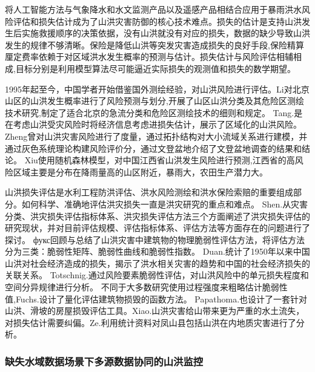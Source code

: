 \documentclass{ctexart}
\begin{document}
将人工智能方法与气象降水和水文监测产品以及遥感产品相结合应用于暴雨洪水风险评估和损失估计成为了山洪灾害防御的核心技术难点。损失的估计是支持山洪发生后实施救援顺序的决策依据，没有山洪就没有对应的损失，数据的缺少导致山洪发生的规律不够清晰。保险是降低山洪等突发灾害造成损失的良好手段,保险精算厘定费率依赖于对区域洪水发生概率的预测与估计。损失估计与风险评估相辅相成,目标分别是利用模型算法尽可能逼近实际损失的观测值和损失的数学期望。

1995年起至今，中国学者开始借鉴国外测绘经验，对山洪风险进行评估。Li\cite{lixian1995torrent}对北京山区的山洪发生概率进行了风险预测与划分,开展了山区山洪分类及其危险区测绘技术研究,制定了适合北京的急流分类和危险区测绘技术的细则和规定。
Tang.\cite{tang2005gis}是在考虑山洪受灾风险时将经济信息考虑进损失估计，展示了区域化的山洪风险。
Zheng\cite{zheng2018study}曾对山洪灾害风险进行了度量，通过拓扑结构对大小流域关系进行建模，并通过灰色系统理论构建风险评价分，通过文登盆地介绍了文登盆地调查的结果和结论。
Xiu\cite{xiuqin2019risk}使用随机森林模型，对中国江西省山洪发生风险进行预测,江西省的高风险区域主要是分布在降雨量高的山区附近，暴雨大，农田生产潜力大。

山洪损失评估是水利工程防洪评估、洪水风险测绘和洪水保险索赔的重要组成部分。如何科学、准确地评估洪灾损失一直是洪灾研究的重点和难点。
Shen.\cite{shen2015progress}从灾害分类、洪灾损失评估指标体系、洪灾损失评估方法三个方面阐述了洪灾损失评估的研究现状，并对目前评估规模、评估指标体系、评估方法等方面存在的问题进行了探讨。
фукс\cite{фукс2020mountain}回顾与总结了山洪灾害中建筑物的物理脆弱性评估方法，将评估方法分为三类：脆弱性矩阵、脆弱性曲线和脆弱性指数。
Duan.\cite{duan2016floods}统计了1950年以来中国山洪对社会经济造成的损失，揭示了洪水相关灾害的趋势和中国的社会经济损失的关联关系。
Totschnig.\cite{totschnig2013mountain}通过风险要素脆弱性评估，对山洪风险中的单元损失程度和空间分异规律进行分析。
不同于大多数研究使用过程强度来粗略估计脆弱性值,Fuchs.\cite{fuchs2012quantitative}设计了量化评估建筑物损毁的函数方法。
Papathoma.\cite{papathoma2015loss}也设计了一套针对山洪、滑坡的房屋损毁评估工具。Xiao.\cite{xiaoyu2017potential}山洪灾害给山带来更为严重的水土流失，对损失估计需要纠偏。Ze.\cite{ze2007geology}利用统计资料对凤山县包括山洪在内地质灾害进行了分析。



\subsubsection{缺失水域数据场景下多源数据协同的山洪监控}
\end{document}
